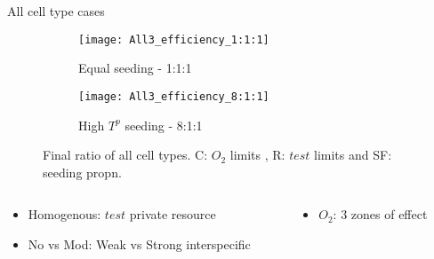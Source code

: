 \begin{frame}{All cell type cases}
  \begin{figure}[h]
    \centering
    \begin{subfigure}[b]{0.48\textwidth}
      \centering
      \texttt{[image: All3\_efficiency\_1:1:1]}
      \caption{Equal seeding - 1:1:1 }
    \end{subfigure}
    \begin{subfigure}[b]{0.48\textwidth}
      \centering
      \texttt{[image: All3\_efficiency\_8:1:1]}
      \caption{High $T^p$ seeding - 8:1:1}
    \end{subfigure}
    \caption{Final ratio of all cell types. C: $O_2$ limits , R: $test$ limits and SF: seeding propn.}
  \end{figure}
  \begin{columns}
    \begin{column}{0.5\textwidth}
      \begin{itemize}
        \item Homogenous: $test$ private resource
        \item No vs Mod: Weak vs Strong interspecific
      \end{itemize}
    \end{column}
    \begin{column}{0.5\textwidth}
      \begin{itemize}
        \item $O_2$: 3 zones of effect
      \end{itemize}
    \end{column}
  \end{columns}
\end{frame}
